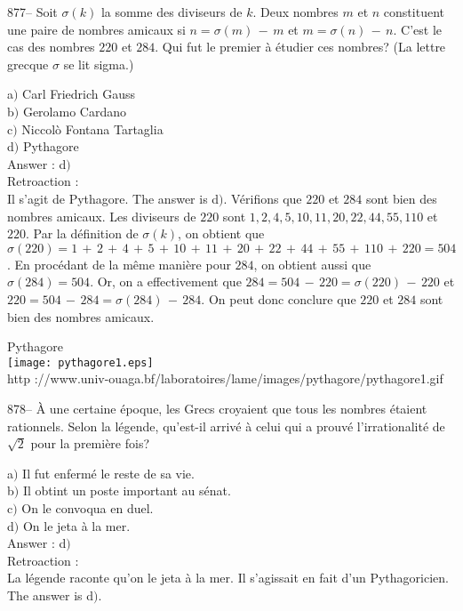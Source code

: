 ﻿\documentclass[letterpaper, 12pt]{article}
\begin{document}
877-- Soit $\sigma(k)$ la somme des diviseurs de $k$. Deux nombres
$m$ et $n$ constituent une paire de nombres amicaux si
$n=\sigma(m)\,-\,m$ et $m=\sigma(n)\,-\,n$. C'est le cas des nombres
$220$ et $284$. Qui fut le premier \`a \'etudier ces nombres? (La
lettre grecque $\sigma$ se lit sigma.)

a$)$ Carl Friedrich Gauss \\
b$)$ Gerolamo Cardano \\
c$)$ Niccol\`o Fontana Tartaglia\\
d$)$ Pythagore \\

Answer : d$)$\\

Retroaction :\\
Il s'agit de Pythagore. The answer is d$)$. V\'erifions que $220$
et $284$ sont bien des nombres amicaux. Les diviseurs de $220$ sont
$1,2,4,5,10,11,20,22,44,55,110$ et $220$. Par la d\'efinition de
$\sigma(k)$, on obtient que
$\sigma(220)=1\,+\,2\,+\,4\,+\,5\,+\,10\,+\,11\,+\,20\,+\,22\,+\,44\,+\,55\,+\,110\,+\,220=504$.
En proc\'edant de la m\^eme mani\`ere pour $284$, on obtient aussi
que $\sigma(284)=504$. Or, on a effectivement que
$284=504\,-\,220=\sigma(220)\,-\,220$ et
$220=504\,-\,284=\sigma(284)\,-\,284$. On peut donc conclure
que $220$ et $284$ sont bien des nombres amicaux. \\

        \begin{center}
        Pythagore\\
    \texttt{[image: pythagore1.eps]}\\
        {\footnotesize http
://www.univ-ouaga.bf/laboratoires/lame/images/pythagore/pythagore1.gif}
    \end{center}

878-- \`A une certaine \'epoque, les Grecs croyaient que tous les
nombres \'etaient rationnels. Selon la l\'egende, qu'est-il arriv\'e
\`a celui qui a prouv\'e l'irrationalit\'e de $\sqrt2$ pour la
premi\`ere fois?

a$)$ Il fut enferm\'e le reste de sa vie. \\
b$)$ Il obtint un poste important au s\'enat. \\
c$)$ On le convoqua en duel. \\
d$)$ On le jeta \`a la mer.\\

Answer : d$)$\\

Retroaction : \\
La l\'egende raconte qu'on le jeta \`a la mer. Il s'agissait en fait d'un
Pythagoricien. The answer is d$)$.\\
\end{document}
